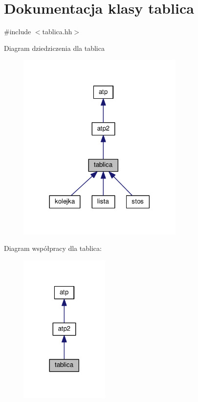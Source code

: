 \hypertarget{classtablica}{}\section{Dokumentacja klasy tablica}
\label{classtablica}


{\ttfamily \#include $<$tablica.\+hh$>$}



Diagram dziedziczenia dla tablica\nopagebreak
\begin{figure}[H]
\begin{center}
\leavevmode
\includegraphics[width=233pt]{classtablica__inherit__graph}
\end{center}
\end{figure}


Diagram współpracy dla tablica\+:\nopagebreak
\begin{figure}[H]
\begin{center}
\leavevmode
\includegraphics[width=125pt]{classtablica__coll__graph}
\end{center}
\end{figure}
